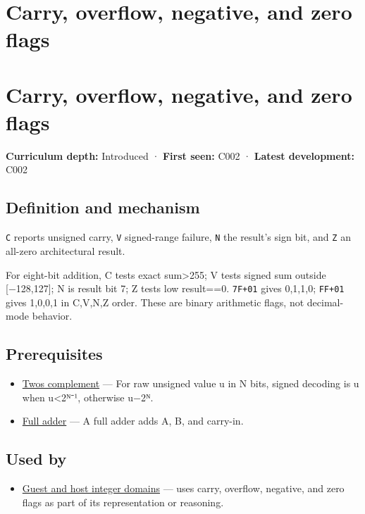 \hypertarget{appendix-8d687c9c08ab}{}
\section*{Carry, overflow, negative, and zero flags}
\section{Carry, overflow, negative, and zero flags}\label{appendix-8d687c9c08ab-carry-overflow-negative-and-zero-flags}

\textbf{Curriculum depth:} Introduced · \textbf{First seen:} C002 · \textbf{Latest development:} C002

\subsection{Definition and mechanism}\label{appendix-8d687c9c08ab-definition-and-mechanism}

\texttt{C} reports unsigned carry, \texttt{V} signed-range failure, \texttt{N} the result's sign bit, and \texttt{Z} an all-zero architectural result.

For eight-bit addition, C tests exact sum\textgreater255; V tests signed sum outside {[}−128,127{]}; N is result bit 7; Z tests low result==0. \texttt{7F+01} gives 0,1,1,0; \texttt{FF+01} gives 1,0,0,1 in C,V,N,Z order. These are binary arithmetic flags, not decimal-mode behavior.

\subsection{Prerequisites}\label{appendix-8d687c9c08ab-prerequisites}

\begin{itemize}
\tightlist
\item
  \hyperref[appendix-4fbc03d20829]{Two\textquotesingle s complement} --- For raw unsigned value u in N bits, signed decoding is u when u\textless2ᴺ⁻¹, otherwise u−2ᴺ.
\item
  \hyperref[appendix-d1a5b1e520c2]{Full adder} --- A full adder adds A, B, and carry-in.
\end{itemize}

\subsection{Used by}\label{appendix-8d687c9c08ab-used-by}

\begin{itemize}
\tightlist
\item
  \hyperref[appendix-33e7a011b684]{Guest and host integer domains} --- uses carry, overflow, negative, and zero flags as part of its representation or reasoning.
\end{itemize}

